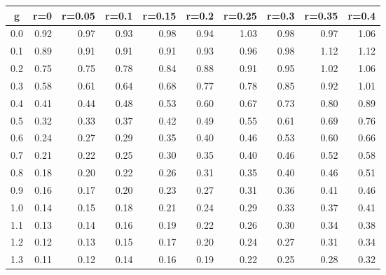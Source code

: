 %
\begin{table}[!tbp]
 \begin{center}
 \begin{tabular}{rrrrrrrrrr}\hline\hline
\multicolumn{1}{c}{g}&\multicolumn{1}{c}{r=0}&\multicolumn{1}{c}{r=0.05}&\multicolumn{1}{c}{r=0.1}&\multicolumn{1}{c}{r=0.15}&\multicolumn{1}{c}{r=0.2}&\multicolumn{1}{c}{r=0.25}&\multicolumn{1}{c}{r=0.3}&\multicolumn{1}{c}{r=0.35}&\multicolumn{1}{c}{r=0.4}\tabularnewline
\hline
0.0&0.92&0.97&0.93&0.98&0.94&1.03&0.98&0.97&1.06\tabularnewline
0.1&0.89&0.91&0.91&0.91&0.93&0.96&0.98&1.12&1.12\tabularnewline
0.2&0.75&0.75&0.78&0.84&0.88&0.91&0.95&1.02&1.06\tabularnewline
0.3&0.58&0.61&0.64&0.68&0.77&0.78&0.85&0.92&1.01\tabularnewline
0.4&0.41&0.44&0.48&0.53&0.60&0.67&0.73&0.80&0.89\tabularnewline
0.5&0.32&0.33&0.37&0.42&0.49&0.55&0.61&0.69&0.76\tabularnewline
0.6&0.24&0.27&0.29&0.35&0.40&0.46&0.53&0.60&0.66\tabularnewline
0.7&0.21&0.22&0.25&0.30&0.35&0.40&0.46&0.52&0.58\tabularnewline
0.8&0.18&0.20&0.22&0.26&0.31&0.35&0.40&0.46&0.51\tabularnewline
0.9&0.16&0.17&0.20&0.23&0.27&0.31&0.36&0.41&0.46\tabularnewline
1.0&0.14&0.15&0.18&0.21&0.24&0.29&0.33&0.37&0.41\tabularnewline
1.1&0.13&0.14&0.16&0.19&0.22&0.26&0.30&0.34&0.38\tabularnewline
1.2&0.12&0.13&0.15&0.17&0.20&0.24&0.27&0.31&0.34\tabularnewline
1.3&0.11&0.12&0.14&0.16&0.19&0.22&0.25&0.28&0.32\tabularnewline
\hline
\end{tabular}

\end{center}

\end{table}

